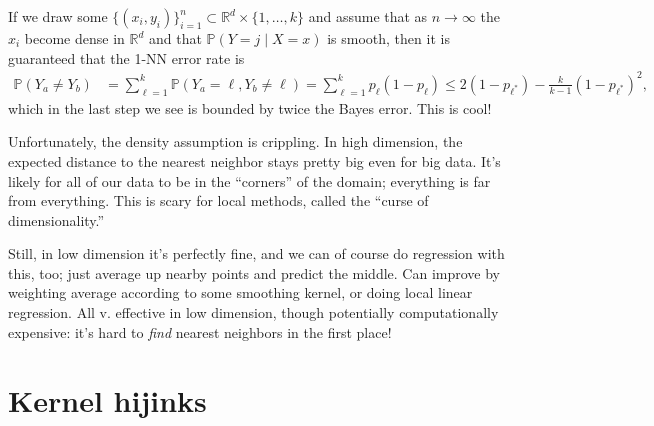 \documentclass[11pt,letterpaper]{article}
\theoremstyle{definition}
\numberwithin{equation}{section}
\numberwithin{figure}{section}
\begin{document}
If we draw some $\{(x_i,y_i)\}_{i=1}^n \subset \mathbb{R}^d \times \{1,\ldots,k\}$ and assume that as $n \to \infty$ the $x_i$ become dense in $\mathbb{R}^d$ and that $\mathbb{P}(Y=j\mid X=x)$ is smooth, then it is guaranteed that the 1-NN error rate is
%
\begin{align}
	\mathbb{P}(Y_a \neq Y_b) &= \sum_{\ell=1}^k \mathbb{P}(Y_a = \ell, Y_b \neq \ell) = \sum_{\ell=1}^k p_\ell(1-p_\ell) \leq 2 (1-p_{\ell^\ast}) - \frac{k}{k-1} (1-p_{\ell^\ast})^2,
\end{align}
%
which in the last step we see is bounded by twice the Bayes error. This is cool!

Unfortunately, the density assumption is crippling. In high dimension, the expected distance to the nearest neighbor stays pretty big even for big data. It's likely for all of our data to be in the ``corners'' of the domain; everything is far from everything. This is scary for local methods, called the ``curse of dimensionality.''

Still, in low dimension it's perfectly fine, and we can of course do regression with this, too; just average up nearby points and predict the middle. Can improve by weighting average according to some smoothing kernel, or doing local linear regression. All v. effective in low dimension, though potentially computationally expensive: it's hard to \emph{find} nearest neighbors in the first place!



















\section{Kernel hijinks}
\end{document}
